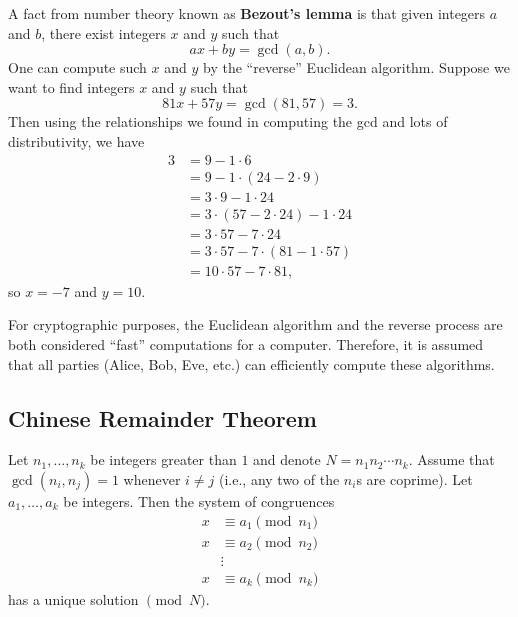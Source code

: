 \documentclass{article}
\begin{document}
        A fact from number theory known as \textbf{Bezout's lemma} is that given integers \(a\) and \(b\), there exist integers \(x\) and \(y\) such that
        \[ax + by = \gcd(a,b).\]
        One can compute such \(x\) and \(y\) by the ``reverse'' Euclidean algorithm.
        Suppose we want to find integers \(x\) and \(y\) such that
        \[81x + 57y = \gcd(81,57) = 3.\]
        Then using the relationships we found in computing the gcd and lots of distributivity, we have
        \begin{align*}
            3 &= 9 - 1\cdot 6\\
            &= 9 - 1\cdot(24 - 2\cdot 9)\\
            &= 3\cdot 9 - 1\cdot 24\\
            &= 3\cdot(57 - 2\cdot 24) - 1\cdot 24\\ 
            &= 3\cdot 57 - 7\cdot 24\\
            &= 3\cdot 57 - 7\cdot (81 - 1\cdot 57)\\
            &= 10\cdot 57 - 7\cdot 81,
        \end{align*}
        so \(x = -7\) and \(y=10\).

        For cryptographic purposes, the Euclidean algorithm and the reverse process are both considered ``fast'' computations for a computer.
        Therefore, it is assumed that all parties (Alice, Bob, Eve, etc.) can efficiently compute these algorithms.

    \subsection{Chinese Remainder Theorem}

        \begin{theorem}[CRT]
            Let \(n_1,\ldots,n_k\) be integers greater than \(1\) and denote \(N=n_1n_2\cdots n_k\).
            Assume that \(\gcd(n_i,n_j)=1\) whenever \(i\neq j\) (i.e., any two of the \(n_i\)s are coprime).
            Let \(a_1,\ldots,a_k\) be integers.
            Then the system of congruences
            \begin{align*}
                x &\equiv a_1\pmod{n_1}\\
                x &\equiv a_2\pmod{n_2}\\
                &\vdots\\
                x &\equiv a_k\pmod{n_k}
            \end{align*}
            has a unique solution \(\pmod{N}\).
        \end{theorem}
\end{document}
